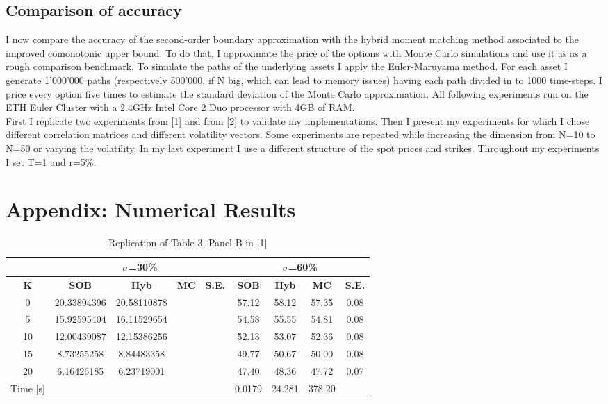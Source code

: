 \documentclass[a4paper]{article}
\begin{document}
\subsection{Comparison of accuracy}
\label{sec:accuracy}
I now compare the accuracy of the second-order boundary approximation with the hybrid moment matching method associated to the improved comonotonic upper bound. To do that, I approximate the price of the options with Monte Carlo simulations and use it as as a rough comparison benchmark. To simulate the paths of the underlying assets I apply the Euler-Maruyama method. For each asset I generate 1'000'000 paths (respectively 500'000, if N big, which can lead to memory issues) having each path divided in to 1000 time-steps. I price every option five times to estimate the standard deviation of the Monte Carlo approximation. All following experiments run on the ETH Euler Cluster with a 2.4GHz Intel Core 2 Duo processor with 4GB of RAM. \\
First I replicate two experiments from [1] and from [2] to validate my implementations. Then I present my experiments for which I chose different correlation matrices and different volatility vectors. Some experiments are repeated while increasing the dimension from N=10 to N=50 or varying the volatility. In my last experiment I use a different structure of the spot prices and strikes. Throughout my experiments I set T=1 and r=5\%.\\

\newpage
\section{Appendix: Numerical Results}
\label{sec:appendix}


\captionsetup{skip=0pt}
\begin {table}[H]
\caption {Replication of Table 3, Panel B in [1]} 
\begin{center}
\begin{tabular}{c|c c c c|c c c c}
\hline
\multicolumn{1}{c|}{} & \multicolumn{4}{|c|}{$\sigma$=30\%} & \multicolumn{4}{|c}{$\sigma$=60\%} \\ 
\hline
  \textbf{K} & \textbf{SOB} & \textbf{Hyb}	& \textbf{MC} & \textbf{S.E.} & \textbf{SOB} & \textbf{Hyb} & \textbf{MC} & \textbf{S.E.}\\
  0 &	20.33894396 & 20.58110878 &  & & 57.12  & 58.12 & 57.35 & 0.08\\
  5 & 15.92595404 & 16.11529654 & & & 54.58 & 55.55 & 54.81 & 0.08 \\
10 & 12.00439087 & 12.15386256 & &  & 52.13 & 53.07  & 52.36 & 0.08 \\
15 & 8.73255258 & 8.84483358 &  &  & 49.77 & 50.67 & 50.00 & 0.08\\
20 & 6.16426185 & 6.23719001 &  &  & 47.40 & 48.36 & 47.72 & 0.07\\
\hline
Time [s] & & & & & 0.0179& 24.281 & 378.20& \\
\hline
\end{tabular}
\end{center}
\end{table}
\end{document}

